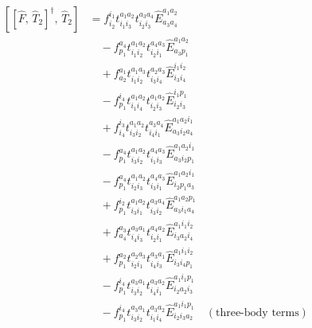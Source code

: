 \documentclass[11pt]{article}
\begin{document}
\begin{align}
\left[\left[\hat{F},\, \hat{T}_{2}\right]^{\dagger},\, \hat{T}_{2}\right] &= f^{i_{1}}_{i_{2}} t^{a_{1}a_{2}}_{i_{1}i_{3}} t^{a_{3}a_{4}}_{i_{2}i_{3}} \hat{E}^{a_{1}a_{2}}_{a_{3}a_{4}} \\
&\quad - f^{a_{4}}_{p_{1}} t^{a_{1}a_{2}}_{i_{1}i_{2}} t^{a_{4}a_{3}}_{i_{2}i_{1}} \hat{E}^{a_{1}a_{2}}_{a_{3}p_{1}} \\
&\quad + f^{a_{1}}_{a_{2}} t^{a_{1}a_{3}}_{i_{1}i_{2}} t^{a_{2}a_{3}}_{i_{3}i_{4}} \hat{E}^{i_{1}i_{2}}_{i_{3}i_{4}} \\
&\quad - f^{i_{4}}_{p_{1}} t^{a_{1}a_{2}}_{i_{1}i_{4}} t^{a_{1}a_{2}}_{i_{2}i_{3}} \hat{E}^{i_{1}p_{1}}_{i_{2}i_{3}} \\
&\quad + f^{i_{3}}_{i_{4}} t^{a_{1}a_{2}}_{i_{3}i_{2}} t^{a_{3}a_{4}}_{i_{4}i_{1}} \hat{E}^{a_{1}a_{2}i_{1}}_{a_{3}i_{2}a_{4}} \\
&\quad - f^{a_{4}}_{p_{1}} t^{a_{1}a_{2}}_{i_{3}i_{2}} t^{a_{4}a_{3}}_{i_{1}i_{3}} \hat{E}^{a_{1}a_{2}i_{1}}_{a_{3}i_{2}p_{1}} \\
&\quad - f^{a_{4}}_{p_{1}} t^{a_{1}a_{2}}_{i_{2}i_{3}} t^{a_{4}a_{3}}_{i_{3}i_{1}} \hat{E}^{a_{1}a_{2}i_{1}}_{i_{2}p_{1}a_{3}} \\
&\quad + f^{i_{2}}_{p_{1}} t^{a_{1}a_{2}}_{i_{3}i_{1}} t^{a_{3}a_{4}}_{i_{3}i_{2}} \hat{E}^{a_{1}a_{2}p_{1}}_{a_{3}i_{1}a_{4}} \\
&\quad + f^{a_{3}}_{a_{4}} t^{a_{3}a_{1}}_{i_{4}i_{3}} t^{a_{4}a_{2}}_{i_{2}i_{1}} \hat{E}^{a_{1}i_{1}i_{2}}_{i_{3}a_{2}i_{4}} \\
&\quad + f^{a_{2}}_{p_{1}} t^{a_{2}a_{3}}_{i_{2}i_{1}} t^{a_{3}a_{1}}_{i_{4}i_{3}} \hat{E}^{a_{1}i_{1}i_{2}}_{i_{3}i_{4}p_{1}} \\
&\quad - f^{i_{4}}_{p_{1}} t^{a_{3}a_{1}}_{i_{3}i_{2}} t^{a_{3}a_{2}}_{i_{4}i_{1}} \hat{E}^{a_{1}i_{1}p_{1}}_{i_{2}a_{2}i_{3}} \\
&\quad - f^{i_{4}}_{p_{1}} t^{a_{3}a_{1}}_{i_{3}i_{2}} t^{a_{3}a_{2}}_{i_{1}i_{4}} \hat{E}^{a_{1}i_{1}p_{1}}_{i_{2}i_{3}a_{2}}\quad (\text{three-body terms})
\end{align}
\end{document}
